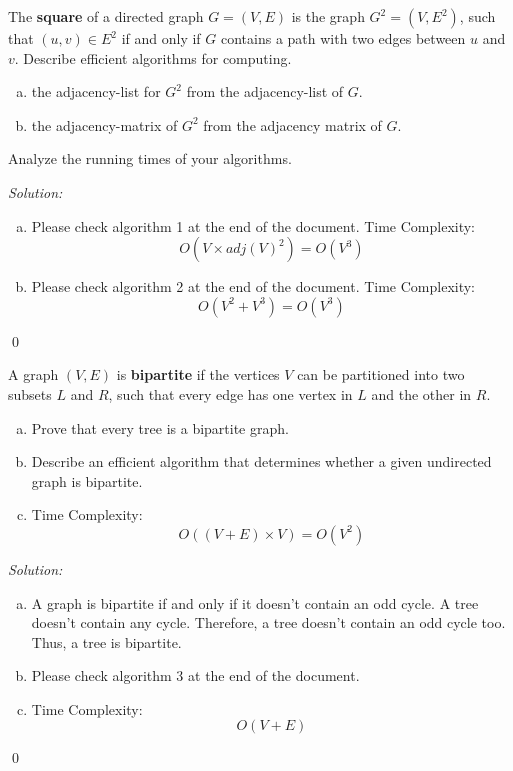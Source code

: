 \documentclass[12pt]{article}
\newenvironment{problem}[2][Problem]{\begin{trivlist}
\item[\hskip \labelsep {\bfseries #1}\hskip \labelsep {\bfseries #2.}]}{\end{trivlist}}
\newenvironment{sol}
    {\emph{Solution:}
    }
    {
    \qed
    }
\begin{document}
\begin{problem}{1} The \textbf{square} of a directed graph $G= (V, E)$ is the graph $G^2 = (V, E^2)$, such that $(u, v) \in E^2$ if and only if $G$ contains a path with two edges between $u$ and $v$. Describe efficient algorithms for computing.

\begin{enumerate}[(a)]
    \item the adjacency-list for $G^2$ from the adjacency-list of $G$.
    \item the adjacency-matrix of $G^2$ from the adjacency matrix of $G$.
\end{enumerate}

Analyze the running times of your algorithms.
\end{problem}
\begin{sol}
\begin{enumerate}[(a)]
    \item Please check algorithm 1 at the end of the document. Time Complexity: $$O(V \times adj(V)^2)=O(V^3)$$
    \item Please check algorithm 2 at the end of the document. Time Complexity: $$O(V^2 + V^3)=O(V^3)$$
\end{enumerate}
\end{sol}

\begin{problem}{2} A graph $(V, E)$ is \textbf{bipartite} if the vertices $V$ can be partitioned into two subsets $L$ and $R$, such that every
edge has one vertex in $L$ and the other in $R$.

\begin{enumerate}[(a)]
    \item Prove that every tree is a bipartite graph. 
    \item Describe an efficient algorithm that determines whether a given undirected graph is bipartite.
    \item Time Complexity: $$O((V + E) \times V) = O(V^2)$$
\end{enumerate}
\end{problem}
\begin{sol}
\begin{enumerate}[(a)]
    \item A graph is bipartite if and only if it doesn't contain an odd cycle. A tree doesn't contain any cycle. Therefore, a tree doesn't contain an odd cycle too. Thus, a tree is bipartite.
    \item Please check algorithm 3 at the end of the document.
    \item Time Complexity: $$O(V+E)$$
\end{enumerate}
\end{sol}
\end{document}
